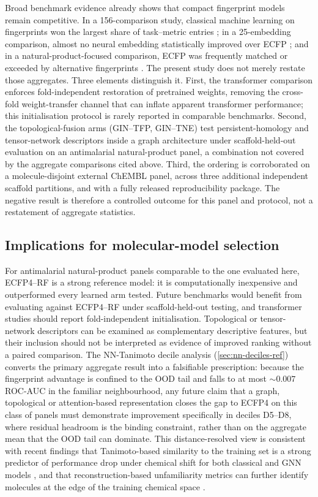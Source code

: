\documentclass[11pt,a4paper]{article}
\begin{document}
Broad benchmark evidence already shows that compact fingerprint models remain competitive. In a \num{156}-comparison study, classical machine learning on fingerprints won the largest share of task--metric entries \citep{guo_ding_2026}; in a \num{25}-embedding comparison, almost no neural embedding statistically improved over ECFP \citep{benchmark_pretrained_2025}; and in a natural-product-focused comparison, ECFP was frequently matched or exceeded by alternative fingerprints \citep{boldini2024}. The present study does not merely restate those aggregates. Three elements distinguish it. First, the transformer comparison enforces fold-independent restoration of pretrained weights, removing the cross-fold weight-transfer channel that can inflate apparent transformer performance; this initialisation protocol is rarely reported in comparable benchmarks. Second, the topological-fusion arms (GIN--TFP, GIN--TNE) test persistent-homology and tensor-network descriptors inside a graph architecture under scaffold-held-out evaluation on an antimalarial natural-product panel, a combination not covered by the aggregate comparisons cited above. Third, the ordering is corroborated on a molecule-disjoint external ChEMBL panel, across three additional independent scaffold partitions, and with a fully released reproducibility package. The negative result is therefore a controlled outcome for this panel and protocol, not a restatement of aggregate statistics.

\subsection{Implications for molecular-model selection}

For antimalarial natural-product panels comparable to the one evaluated here, ECFP4--RF is a strong reference model: it is computationally inexpensive and outperformed every learned arm tested. Future benchmarks would benefit from evaluating against ECFP4--RF under scaffold-held-out testing, and transformer studies should report fold-independent initialisation. Topological or tensor-network descriptors can be examined as complementary descriptive features, but their inclusion should not be interpreted as evidence of improved ranking without a paired comparison. The NN-Tanimoto decile analysis (\cref{sec:nn-deciles-ref}) converts the primary aggregate result into a falsifiable prescription: because the fingerprint advantage is confined to the OOD tail and falls to at most $\sim\num{0.007}$ ROC-AUC in the familiar neighbourhood, any future claim that a graph, topological or attention-based representation closes the gap to ECFP4 on this class of panels must demonstrate improvement specifically in deciles D\num{5}--D\num{8}, where residual headroom is the binding constraint, rather than on the aggregate mean that the OOD tail can dominate. This distance-resolved view is consistent with recent findings that Tanimoto-based similarity to the training set is a strong predictor of performance drop under chemical shift for both classical and GNN models \citep{fooladi2025ood}, and that reconstruction-based unfamiliarity metrics can further identify molecules at the edge of the training chemical space \citep{vantilborg2026edge}.
\end{document}

